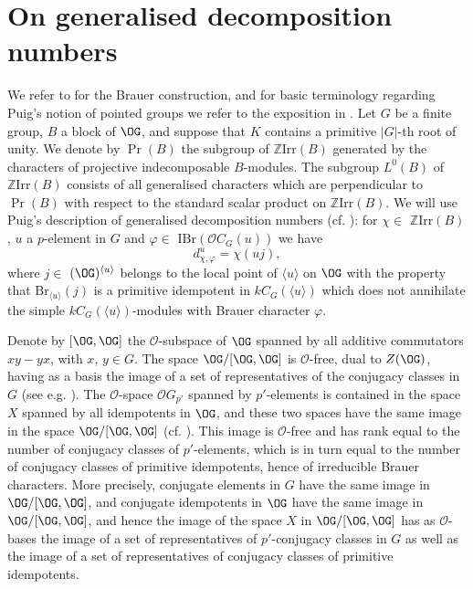 \documentclass{amsart} %
\theoremstyle{plain}\newtheorem{Theorem}{Theorem}[section]
\theoremstyle{plain}\newtheorem{Conjecture}[Theorem]{Conjecture}
\theoremstyle{plain}\newtheorem{Corollary}[Theorem]{Corollary}
\theoremstyle{plain}\newtheorem{Lemma}[Theorem]{Lemma}
\theoremstyle{plain}\newtheorem{Proposition}[Theorem]{Proposition}
\theoremstyle{definition}\newtheorem{Definition}[Theorem]{Definition}
\theoremstyle{definition}\newtheorem{Example}[Theorem]{Example}
\theoremstyle{definition}\newtheorem{Examples}[Theorem]{Examples}
\theoremstyle{definition}\newtheorem{Remark}[Theorem]{Remark}
\theoremstyle{definition}\newtheorem{Remarks}[Theorem]{Remarks}
\theoremstyle{plain}\newtheorem{Statement}[Theorem]{}
\def\CO{{\mathcal{O}}}
\def\Z{{\mathbb Z}}
\def\Br{\mathrm{Br}}             \def\ten{\otimes}
\def\IBr{\mathrm{IBr}}
\def\Irr{\mathrm{Irr}}           \def\tenK{\otimes_K}
\begin{document}
\section{On  generalised decomposition numbers} \label{gendec-Section}   %


We refer to \cite[Section 5.4]{LiBookI} for the Brauer construction, and for
basic terminology regarding Puig's notion of pointed groups we refer
to the exposition in \cite[Section 5.5]{LiBookI}.
Let $G$ be a finite group, $B$ a block of $\OG$, and suppose that $K$ contains
a primitive $|G|$-th root of unity.
 We denote by $\Pr(B)$ the subgroup of $\Z\Irr(B)$ generated
by the characters of projective indecomposable $B$-modules. The subgroup
$L^0(B)$ of $ \Z\Irr(B)$ consists of all generalised characters which are perpendicular
to $\Pr(B)$ with respect to the standard scalar product on $\Z\Irr(B)$. 
We will use   Puig's description 
of generalised decomposition numbers (cf. \cite[Theorem 5.15.3]{LiBookI}):
for $\chi\in$ $\Z\Irr(B)$, $u$ a 
$p$-element in $G$ and $\varphi\in$ $\IBr(\CO C_G(u))$ we have
$$d^u_{\chi,\varphi} = \chi(uj),$$
where $j\in$ $(\OG)^{\langle u\rangle}$ belongs to the local point of $\langle u\rangle$
on $\OG$ with the property that $\Br_{\langle u\rangle}(j)$ is a primitive 
idempotent in $kC_G(\langle u\rangle)$ which does not annihilate the simple 
$kC_G(\langle u\rangle)$-modules with Brauer character $\varphi$. 

\medskip
Denote by $[\OG,\OG]$ the $\CO$-subspace of $\OG$ spanned by all additive 
commutators $xy-yx$,  with $x$, $y\in G$. The space $\OG/[\OG,\OG]$ is
$\CO$-free, dual to $Z(\OG)$, having as a basis the image of a set of representatives 
of the conjugacy classes in $G$ (see e.g.  \cite[Propositions 1.5.4, 1.5.5]{LiBookI}).
The $\CO$-space $\CO G_{p'}$ spanned by $p'$-elements is contained in
the space $X$ spanned by all idempotents in $\OG$, and  these two spaces
have the same image in the space $\OG/[\OG,\OG]$ (cf.  
\cite[Proposition 5.15.16]{LiBookI}).
This image is $\CO$-free and has rank equal to the number of conjugacy classes 
of $p'$-elements, which is in turn equal to the number of conjugacy classes of
 primitive idempotents, hence of irreducible Brauer characters. More precisely, 
conjugate elements in $G$ have the same image in $\OG/[\OG,\OG]$, and
conjugate idempotents in $\OG$ have the same image in $\OG/[\OG,\OG]$, and hence
the image of the space $X$ in $\OG/[\OG,\OG]$ has as $\CO$-bases 
the image of a set of
representatives of $p'$-conjugacy classes in $G$ as well as the image  
of a set of representatives of conjugacy classes of primitive idempotents. 
\end{document}
